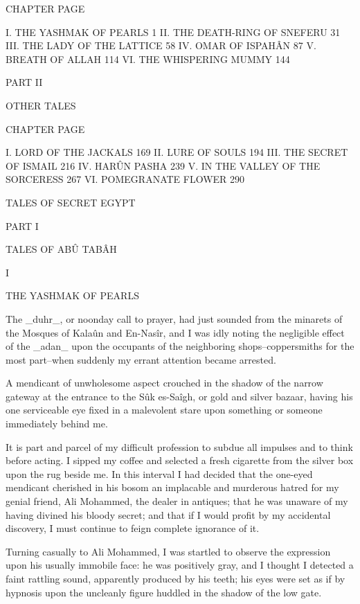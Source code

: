   CHAPTER                             PAGE

    I. THE YASHMAK OF PEARLS             1
   II. THE DEATH-RING OF SNEFERU        31
  III. THE LADY OF THE LATTICE          58
   IV. OMAR OF ISPAHÂN                  87
    V. BREATH OF ALLAH                 114
   VI. THE WHISPERING MUMMY            144


  PART II

  OTHER TALES

  CHAPTER                             PAGE

    I. LORD OF THE JACKALS             169
   II. LURE OF SOULS                   194
  III. THE SECRET OF ISMAIL            216
   IV. HARÛN PASHA                     239
    V. IN THE VALLEY OF THE SORCERESS  267
   VI. POMEGRANATE FLOWER              290




TALES OF SECRET EGYPT




PART I

TALES OF ABÛ TABÂH




I

THE YASHMAK OF PEARLS


The _duhr_, or noonday call to prayer, had just sounded from the
minarets of the Mosques of Kalaûn and En-Nasîr, and I was idly noting
the negligible effect of the _adan_ upon the occupants of the
neighboring shops--coppersmiths for the most part--when suddenly my
errant attention became arrested.

A mendicant of unwholesome aspect crouched in the shadow of the narrow
gateway at the entrance to the Sûk es-Saîgh, or gold and silver
bazaar, having his one serviceable eye fixed in a malevolent stare
upon something or someone immediately behind me.

It is part and parcel of my difficult profession to subdue all
impulses and to think before acting. I sipped my coffee and selected
a fresh cigarette from the silver box upon the rug beside me. In this
interval I had decided that the one-eyed mendicant cherished in his
bosom an implacable and murderous hatred for my genial friend, Ali
Mohammed, the dealer in antiques; that he was unaware of my having
divined his bloody secret; and that if I would profit by my accidental
discovery, I must continue to feign complete ignorance of it.

Turning casually to Ali Mohammed, I was startled to observe the
expression upon his usually immobile face: he was positively gray,
and I thought I detected a faint rattling sound, apparently produced
by his teeth; his eyes were set as if by hypnosis upon the uncleanly
figure huddled in the shadow of the low gate.

